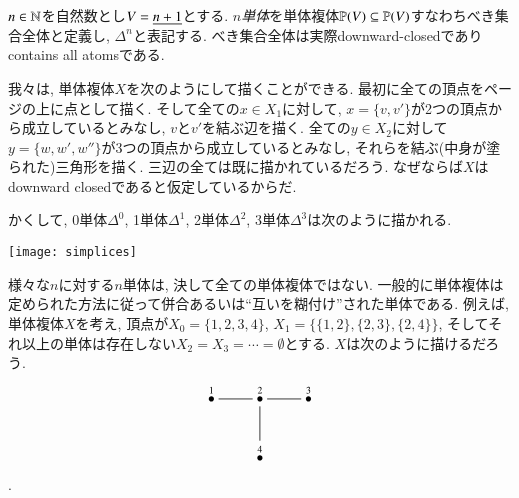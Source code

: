 \begin{example}


$n\in{\mathbb N}$を自然数とし$V=\underline{n+1}$とする. \emph{$n$単体}を単体複体${\mathbb P}(V)\subseteq{\mathbb P}(V)$すなわちべき集合全体と定義し, $\Delta^n$と表記する. べき集合全体は実際downward-closedでありcontains all atomsである.

\end{example}


我々は, 単体複体$X$を次のようにして描くことができる. 最初に全ての頂点をページの上に点として描く. そして全ての$x\in X_1$に対して, $x=\{v,v'\}$が2つの頂点から成立しているとみなし, $v$と$v'$を結ぶ辺を描く. 全ての$y\in X_2$に対して$y=\{w,w',w''\}$が3つの頂点から成立しているとみなし, それらを結ぶ(中身が塗られた)三角形を描く. 三辺の全ては既に描かれているだろう. なぜならば$X$はdownward closedであると仮定しているからだ.

かくして, 0単体$\Delta^0$, 1単体$\Delta^1$, 2単体$\Delta^2$, 3単体$\Delta^3$は次のように描かれる.
\begin{center}
\texttt{[image: simplices]}
\end{center} 


様々な$n$に対する$n$単体は, 決して全ての単体複体ではない. 一般的に単体複体は定められた方法に従って併合あるいは``互いを糊付け''された単体である. 例えば, 単体複体$X$を考え, 頂点が$X_0=\{1,2,3,4\}$, $X_1=\{\{1,2\},\{2,3\},\{2,4\}\}$, そしてそれ以上の単体は存在しない$X_2=X_3=\cdots=\emptyset$とする. $X$は次のように描けるだろう.
$$\xymatrix{\LMO{1}\ar@{-}[r]&\LMO{2}\ar@{-}[r]\ar@{-}[d]&\LMO{3}\\&\LMO{4}}$$.

